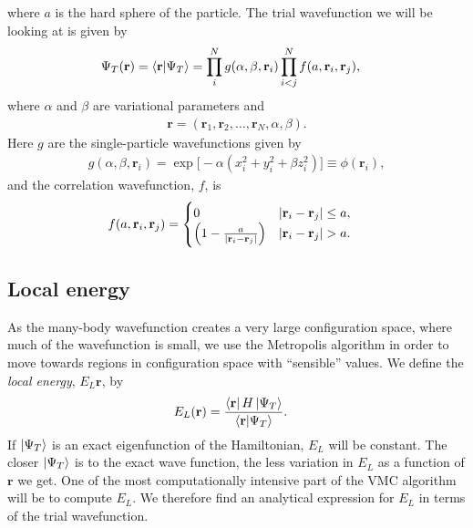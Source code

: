 \documentclass[
    a4paper, aps, twocolumn, floatfix, superscriptaddress]{revtex4-1}
\newcommand{\vf}{\mathbf}
\newcommand{\1}{\mathds{1}}
\begin{document}
    where $a$ is the hard sphere of the particle. The trial wavefunction we will
    be looking at is given by
    \begin{align}
        \Psi_T(\vf{r})
        &= \bra{\vf{r}}\ket{\Psi_T}
        = \prod_i^N g(\alpha, \beta, \vf{r}_i)
        \prod_{i < j}^N f(a, \vf{r}_i, \vf{r}_j),
    \end{align}
    where $\alpha$ and $\beta$ are variational parameters and
    \begin{align}
        \vf{r} = (\vf{r}_1, \vf{r}_2, \dots, \vf{r}_N, \alpha, \beta).
    \end{align}
    Here $g$ are the single-particle wavefunctions given by
    \begin{align}
        g(\alpha, \beta, \vf{r}_i)
        = \exp\bigl[
            -\alpha(x_i^2 + y_i^2 + \beta z_i^2)
        \bigr] \equiv \phi(\vf{r}_i),
    \end{align}
    and the correlation wavefunction, $f$, is
    \begin{align}
        f(a, \vf{r}_i, \vf{r}_j)
        &=
        \begin{cases}
            0 & |\vf{r}_i - \vf{r}_j| \leq a, \\
            \Bigl(
                1 - \frac{a}{|\vf{r}_i - \vf{r}_j|}
            \Bigr) & |\vf{r}_i - \vf{r}_j| > a.
        \end{cases}
    \end{align}

    \subsection{Local energy}
        As the many-body wavefunction creates a very large configuration space,
        where much of the wavefunction is small, we use the Metropolis algorithm
        in order to move towards regions in configuration space with
        ``sensible'' values. We define the \textit{local energy}, $E_L{\vf{r}}$,
        by
        \begin{align}
            E_L(\vf{r})
            &= \frac{\bra{\vf{r}}H\ket{\Psi_T}}{\bra{\vf{r}}\ket{\Psi_T}}.
        \end{align}
        If $\ket{\Psi_T}$ is an exact eigenfunction of the Hamiltonian, $E_L$
        will be constant. The closer $\ket{\Psi_T}$ is to the exact wave
        function, the less variation in $E_L$ as a function of $\vf{r}$ we get.
        One of the most computationally intensive part of the VMC algorithm will
        be to compute $E_L$. We therefore find an analytical expression for
        $E_L$ in terms of the trial wavefunction.
\end{document}
